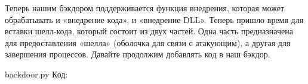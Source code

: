 \documentclass[12pt]{book}
\begin{document}
Теперь нашим бэкдором поддерживается функция внедрения, которая может обрабатывать и «внедрение кода», и «внедрение DLL». Теперь пришло время для вставки шелл-кода, который состоит из двух частей. Одна часть предназначена для предоставления «шелла» (оболочка для связи с атакующим), а другая для завершения процессов. Давайте продолжим добавлять код в наш бэкдор.

backdoor.py
Код:






\end{document}
